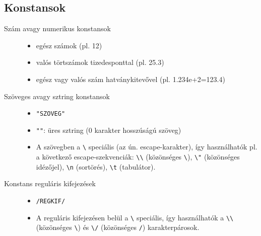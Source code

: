 \subsection{Konstansok}
\begin{description}
\item[Szám avagy numerikus konstansok]\hfill
	\begin{itemize}
	\item egész számok (pl. 12)
	\item valós törtszámok tizedesponttal (pl. 25.3)
	\item egész vagy valós szám hatványkitevővel (pl. 1.234e+2=123.4)
	\end{itemize}
\item[Szöveges avagy sztring konstansok]\hfill
	\begin{itemize}
	\item \verb."SZOVEG".
	\item \verb."".: üres sztring (0 karakter hosszúságú szöveg)
	\item A szövegben a \verb.\. speciális (az ún. escape-karakter), így használhatók pl.
	a következő escape-szekvenciák: \verb.\\. (közönséges \verb.\.), \verb.\". (közönséges
	idézőjel), \verb.\n. (sortörés), \verb.\t. (tabulátor).
	\end{itemize}
\item[Konstans reguláris kifejezések]\hfill
	\begin{itemize}
	\item \texttt{/REGKIF/}
	\item A reguláris kifejezésen belül a \verb.\. speciális, így használhatók a \verb.\\.
	(közönséges \verb.\.) és \verb.\/. (közönséges \verb./.) karakterpárosok.
	\end{itemize}
\end{description}

